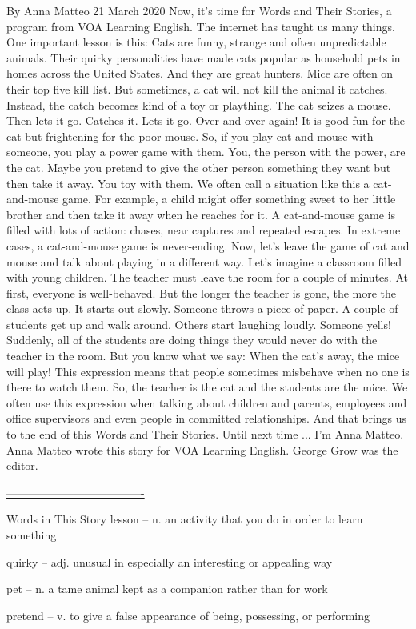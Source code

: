 By Anna Matteo
21 March 2020
Now, it's time for Words and Their Stories, a program from VOA Learning English.
The internet has taught us many things. One important lesson is this: Cats are funny, strange and often unpredictable animals. Their quirky personalities have made cats popular as household pets in homes across the United States.
And they are great hunters. Mice are often on their top five kill list. But sometimes, a cat will not kill the animal it catches. Instead, the catch becomes kind of a toy or plaything.
The cat seizes a mouse. Then lets it go. Catches it. Lets it go. Over and over again! It is good fun for the cat but frightening for the poor mouse.
So, if you play cat and mouse with someone, you play a power game with them. You, the person with the power, are the cat. Maybe you pretend to give the other person something they want but then take it away. You toy with them. We often call a situation like this a cat-and-mouse game. For example, a child might offer something sweet to her little brother and then take it away when he reaches for it.
A cat-and-mouse game is filled with lots of action: chases, near captures and repeated escapes. In extreme cases, a cat-and-mouse game is never-ending.
Now, let's leave the game of cat and mouse and talk about playing in a different way.
Let's imagine a classroom filled with young children. The teacher must leave the room for a couple of minutes. At first, everyone is well-behaved. But the longer the teacher is gone, the more the class acts up. It starts out slowly. Someone throws a piece of paper. A couple of students get up and walk around. Others start laughing loudly. Someone yells! Suddenly, all of the students are doing things they would never do with the teacher in the room.
But you know what we say: When the cat's away, the mice will play!
This expression means that people sometimes misbehave when no one is there to watch them. So, the teacher is the cat and the students are the mice.
We often use this expression when talking about children and parents, employees and office supervisors and even people in committed relationships.
And that brings us to the end of this Words and Their Stories.
Until next time ... I'm Anna Matteo.
Anna Matteo wrote this story for VOA Learning English. George Grow was the editor.

\underline{-------------------------------------}

Words in This Story
lesson – n. an activity that you do in order to learn something

quirky – adj. unusual in especially an interesting or appealing way

pet – n. a tame animal kept as a companion rather than for work

pretend – v. to give a false appearance of being, possessing, or performing




